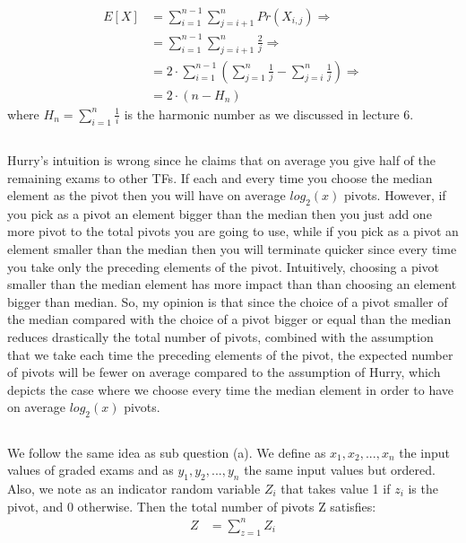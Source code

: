 \documentclass[11pt]{537homework}
\begin{document}
\begingroup
\allowdisplaybreaks
\begin{align*}
 E[X] &= \sum_{i=1}^{n-1} \sum_{j=i+1}^{n} Pr(X_{i,j}) \Longrightarrow \\
      &= \sum_{i=1}^{n-1} \sum_{j=i+1}^{n} \frac{2}{j} \Longrightarrow \\
      &= 2 \cdot \sum_{i=1}^{n-1} (\sum_{j=1}^{n} \frac{1}{j} - \sum_{j=i}^{n} \frac{1}{j}) \Longrightarrow \\
      &= 2 \cdot (n - H_n) 
\end{align*}
\endgroup
where $H_n = \sum_{i=1}^{n} \frac{1}{i}$ is the harmonic number as we discussed in lecture 6.
\subsection{}
Hurry's intuition is wrong since he claims that on average you give half of the remaining exams to other TFs. If each and every time you choose the median element as the pivot then you will have on average $log_{2}(x)$ pivots. However, if you pick as a pivot an element bigger than the median then you just add one more pivot to the total pivots you are going to use, while if you pick as a pivot an element smaller than the median then you will terminate quicker since every time you take only the preceding elements of the pivot. Intuitively, choosing a pivot smaller than the median element has more impact than than choosing an element bigger than median. So, my opinion is that since the choice of a pivot smaller of the median compared with the choice of a pivot bigger or equal than the median reduces drastically the total number of pivots, combined with the assumption that we take each time the preceding elements of the pivot, the expected number of pivots will be fewer on average compared to the assumption of Hurry, which depicts the case where we choose every time the median element in order to have on average $log_{2}(x)$ pivots.
\subsection{}
We follow the same idea as sub question (a). We define as $x_1,x_2,...,x_n$ the input values of graded exams and as $y_1,y_2,...,y_n$ the same input values but ordered. Also, we note as an indicator random variable $Z_i$ that takes value 1 if $z_i$ is the pivot, and 0 otherwise. Then the total number of pivots Z satisfies:
\begingroup
\allowdisplaybreaks
\begin{align*}
 Z &= \sum_{z=1}^{n} Z_{i}
\end{align*}
\endgroup
\end{document}
